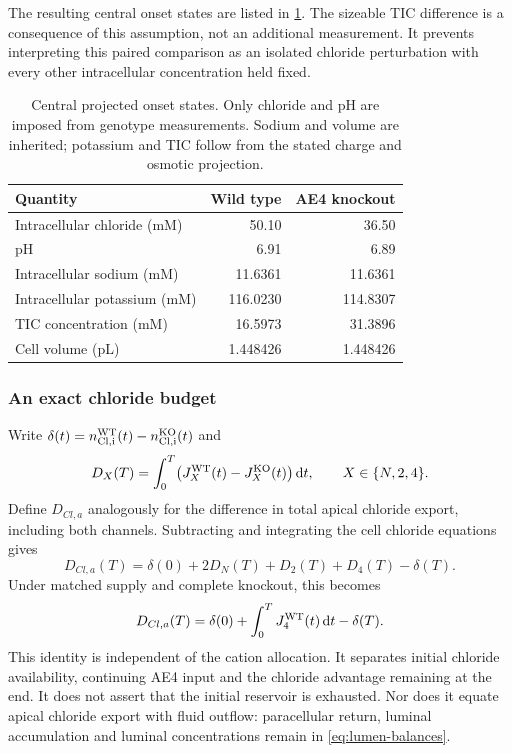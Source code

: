 The resulting central onset states are listed in \cref{tab:onset}. The sizeable TIC difference is a consequence of this assumption, not an additional measurement. It prevents interpreting this paired comparison as an isolated chloride perturbation with every other intracellular concentration held fixed.
\begin{table}[t]
\centering
\caption{Central projected onset states. Only chloride and pH are imposed from genotype measurements. Sodium and volume are inherited; potassium and TIC follow from the stated charge and osmotic projection.}
\label{tab:onset}
\begin{tabular}{lrr}
\toprule
Quantity & Wild type & AE4 knockout\\
\midrule
Intracellular chloride (mM) & 50.10 & 36.50\\
pH & 6.91 & 6.89\\
Intracellular sodium (mM) & 11.6361 & 11.6361\\
Intracellular potassium (mM) & 116.0230 & 114.8307\\
TIC concentration (mM) & 16.5973 & 31.3896\\
Cell volume (pL) & 1.448426 & 1.448426\\
\bottomrule
\end{tabular}
\end{table}

\subsubsection{An exact chloride budget}

Write $\delta(t)=n_{\rm Cl,i}^{\rm WT}(t)-n_{\rm Cl,i}^{\rm KO}(t)$ and
\begin{equation*}
 D_X(T)=\int_0^T\bigl(J_X^{\rm WT}(t)-J_X^{\rm KO}(t)\bigr)\,\mathrm{d} t,
 \qquad X\in\{N,2,4\}.
\end{equation*}
Define $D_{Cl,a}$ analogously for the difference in total apical chloride export, including both channels. Subtracting and integrating the cell chloride equations gives
\begin{equation}
 D_{Cl,a}(T)=\delta(0)+2D_N(T)+D_2(T)+D_4(T)-\delta(T).
 \label{eq:reservoir-general}
\end{equation}
Under matched supply and complete knockout, this becomes
\begin{equation}
 D_{Cl,a}(T)=\delta(0)+\int_0^T J_4^{\rm WT}(t)\,\mathrm{d} t-\delta(T).
 \label{eq:reservoir-matched}
\end{equation}
This identity is independent of the cation allocation. It separates initial chloride availability, continuing AE4 input and the chloride advantage remaining at the end. It does not assert that the initial reservoir is exhausted. Nor does it equate apical chloride export with fluid outflow: paracellular return, luminal accumulation and luminal concentrations remain in \cref{eq:lumen-balances}.

